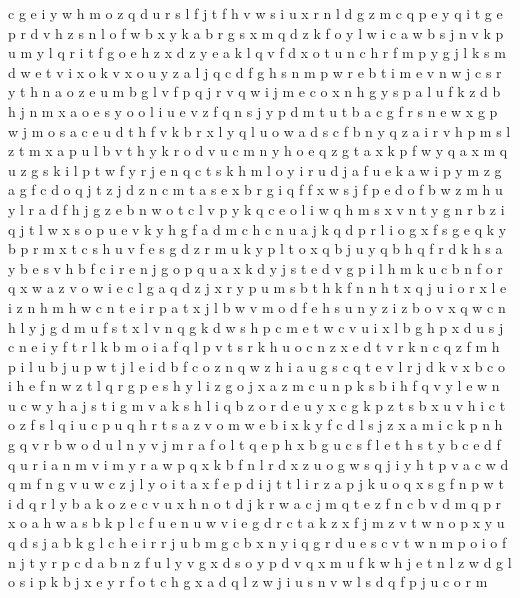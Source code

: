 \documentclass{article}
\begin{document}
c g e i y w h m o z q d u r s l f j
t f h v w s i u x r n l d g z m c q p e y
q i t g e p r d v h z s n l o f w b x y k a
b r g s x m q d z k f o y l w i
c a w b s j n v k p u m y l q r i t f g o e h z x d
z y e a k l q v f d x o t u n c h r
f
m p
y g j l k s m d w e t v i x o
k v x o u y z a l j q c d f g h s n m p w r e b t i
m e v n w j
c s r y t h n a o z e u m b g l v f p q j
r v q w i j m e c o x n h g y s p a l u f k z d b
h j n m x a o e s y
o
o l i u e v z f q n s j y p d m t
u t
b a c g f r s n e w x
g p w j m o s a c e u d t h f v k b r x l y q
l u o w a d s c
f b n y q z a i r v h p m s
l z t m
x a p u l b v t h y k r o d
v u c m n y h o e q z g t a x k p f w
y q a
x m q u z g s k i l p t w f y r j e
n q c t s k h m l o y i r u d j a f
u e k a w i p y m z g
a g f c d o q j t z
j d z n c m t a s e x b r g i q f
f
x w s j f p e
d o f b w z m h u y l
r a d f h j g z e b n w o t c l v p y k
q
c e o l i w q h m s x v n t y g
n r b z i q j t l w x s o p u e v k y h g f a d m c
h c n u a j k q d p r l i o g x f
s g e q k y
b p r m x t c s h u v f
e s g d z r m u k y p l t o x q b
j u y q b h
q f r d k h s a y b e
s v h b f c i r e n j g o p q u a x k d
y j s t e d v g p i l h m k u c b n f o r q x w a z
v o w i e c l g a q d z j x r y p u m s b t h k f n
n h t x q
j u i o r x l e
i z n h
m h w c n t e
i r p a t x j l b w v m o d f e h s u n y z
i z b
o v x q w c n h l y j g d m u f s t
x l v n q g k d w s h p c m e
t w c v u i x l b g
h p x d u s j c n e i y f t r l k b m o
i a f q l p v t s r k h u o c n z x
e d t v r k n c q z f m h p i l u b j
u p w t j l e i d b f c o z n q
w z h i a u g s c q t e v l r
j d k v x b c o i h e f n w z t l q r g p
e s h y l i z
g o j x a z m c u n p k s b i h f q v y l e w
n u c w y h a j s t i
g m v a k s h l i q b z o r d e u y x c
g k p z t s b x u v h i c
t o z f s l q i u c
p u q h r t s a z v o m w e b i x k y f c d l
s j z x a m i c k p n h g q v r b w o d u l
n y v j m r a f o l t q e p h x b g u
c s f l e t
h s t y b c e d f q u r i a n m v
i m y r a w p q x
k b f n l r d x z u o g w s q j i y h t p v a c
w d q m f n
g v u w c z j l y o i t a x f e p
d i j t
t l i r z a p j k u o q x s g
f n p w t i d q r l y b a k o z e c v u x h
n o t d j k
r w a c j m q
t e z f n c b v d m q p r x o a
h w a s b k p l c f u e
n u w v i e g d r c t a k z x f j
m z v t w n o p x y u q d s j a b k g l c h e i r
r j u b m g
c b x n
y i q g r d u e s c v t w n m p o
i o f n j t y
r p c d a b n z f u l y
v g x d s
o y p d v q x m u f k w h j e t n l z
w d g l o s i p k b j x
e y r f o t c h g x a d q l z w j i u s n v
w l s d q f p j u c o r m
\end{document}
